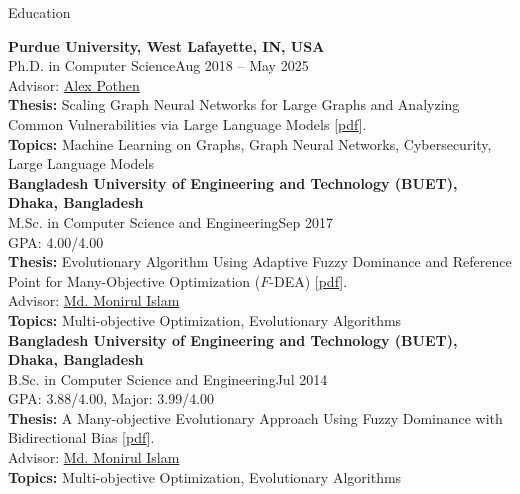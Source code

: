 \documentclass{resume} %
\begin{document}
\begin{rSection}{Education}

{\bf Purdue University, West Lafayette, IN, USA}\\
{Ph.D. in Computer Science}\hfill {Aug 2018 -- May 2025}\\
Advisor: \href{https://www.cs.purdue.edu/homes/apothen/}{Alex Pothen}\\
\textbf{Thesis:} Scaling Graph Neural Networks for Large Graphs and Analyzing Common Vulnerabilities via Large Language Models [\href{https://hammer.purdue.edu/articles/thesis/Scaling_Graph_Neural_Networks_for_Large_Graphs_and_Analyzing_Common_Vulnerabilities_via_Large_Language_Models/28856864}{pdf}].\\
\textbf{Topics:} Machine Learning on Graphs, Graph Neural Networks, Cybersecurity, Large Language Models \\

{\bf Bangladesh University of Engineering and Technology (BUET), Dhaka, Bangladesh}\\
{M.Sc. in Computer Science and Engineering}\hfill {Sep 2017}\\
GPA: 4.00/4.00\\
\textbf{Thesis:} Evolutionary Algorithm Using Adaptive Fuzzy Dominance and Reference Point for Many-Objective Optimization ($F$-DEA) [\href{https://drive.google.com/open?id=1-hbCL9_WCNSZu0qSFklLzoJqylzHG_2k}{pdf}].\\
Advisor: \href{https://cse.buet.ac.bd/faculty/facdetail.php?id=mdmonirulislam}{Md. Monirul Islam}\\
\textbf{Topics:} Multi-objective Optimization, Evolutionary Algorithms \\

{\bf Bangladesh University of Engineering and Technology (BUET), Dhaka, Bangladesh}\\
{B.Sc. in Computer Science and Engineering}\hfill {Jul 2014}\\
GPA: 3.88/4.00, Major: 3.99/4.00\\
\textbf{Thesis:} A Many-objective Evolutionary Approach Using Fuzzy Dominance with Bidirectional Bias [\href{https://drive.google.com/open?id=0B-SybtAwa8vccEI0UWkybGdWVzg}{pdf}].\\
Advisor: \href{https://cse.buet.ac.bd/faculty/facdetail.php?id=mdmonirulislam}{Md. Monirul Islam}\\
\textbf{Topics:} Multi-objective Optimization, Evolutionary Algorithms

\end{rSection}
\end{document}
